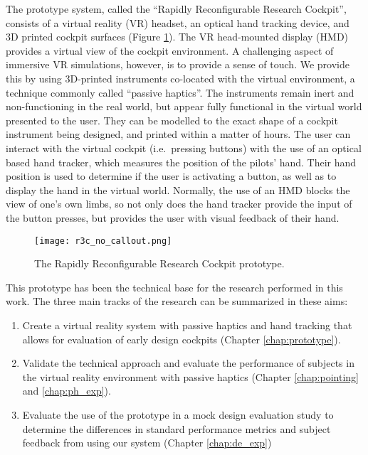 The prototype system, called the ``Rapidly Reconfigurable Research Cockpit'', consists of a virtual reality (VR) headset, an optical hand tracking device, and 3D printed cockpit surfaces (Figure \ref{fig:intro_r3c}).
The VR head-mounted display (HMD) provides a virtual view of the cockpit environment.
A challenging aspect of immersive VR simulations, however, is to provide a sense of touch.
We provide this by using 3D-printed instruments co-located with the virtual environment, a technique commonly called ``passive haptics''.
The instruments remain inert and non-functioning in the real world, but appear fully functional in the virtual world presented to the user.
They can be modelled to the exact shape of a cockpit instrument being designed, and printed within a matter of hours.
The user can interact with the virtual cockpit (i.e.\ pressing buttons) with the use of an optical based hand tracker, which measures the position of the pilots' hand.
Their hand position is used to determine if the user is activating a button, as well as to display the hand in the virtual world.
Normally, the use of an HMD blocks the view of one's own limbs, so not only does the hand tracker provide the input of the button presses, but provides the user with visual feedback of their hand.

\begin{figure}
    \centering
    \texttt{[image: r3c\_no\_callout.png]}
    \caption{The Rapidly Reconfigurable Research Cockpit prototype.}
    \label{fig:intro_r3c}
\end{figure}

This prototype has been the technical base for the research performed in this work.
The three main tracks of the research can be summarized in these aims:


\begin{enumerate}
    \item Create a virtual reality system with passive haptics and hand tracking that allows for evaluation of early design cockpits (Chapter \ref{chap:prototype}).
    \item Validate the technical approach and evaluate the performance of subjects in the virtual reality environment with passive haptics (Chapter \ref{chap:pointing} and \ref{chap:ph_exp}).
    \item Evaluate the use of the prototype in a mock design evaluation study to determine the differences in standard performance metrics and subject feedback from using our system (Chapter \ref{chap:de_exp})
\end{enumerate}

